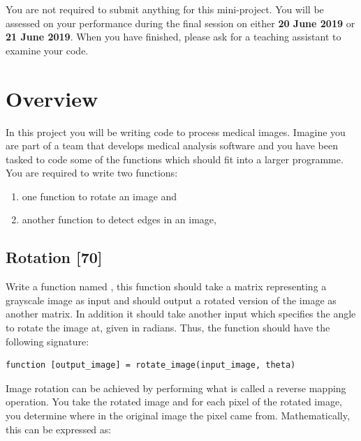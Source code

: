 You are not required to submit anything for this mini-project. You will be assessed on your performance during the final session on either \textbf{20 June 2019} or \textbf{21 June 2019}. When you have finished, please ask for a teaching assistant to examine your code.
\section{Overview}
In this project you will be writing code to process medical images. Imagine you are part of a team that develops medical analysis software and you have been tasked to code some of the functions which should fit into a larger programme.  You are required to write two functions:

\begin{enumerate}
	\item one function to rotate an image and
	\item another function to detect edges in an image,
\end{enumerate}

\subsection{Rotation [70]}
Write a function named , this function should take a matrix representing a grayscale image as input and should output a rotated version of the image as another matrix. In addition it should take another input which specifies the angle to rotate the image at, given in radians. Thus, the function should have the following signature:

\begin{minipage}{\textwidth}
\begin{lstlisting}
function [output_image] = rotate_image(input_image, theta)
\end{lstlisting}
\end{minipage}

Image rotation can be achieved by performing what is called a reverse mapping operation. You take the rotated image and for each pixel of the rotated image, you determine where in the original image the pixel came from. Mathematically, this can be expressed as:

